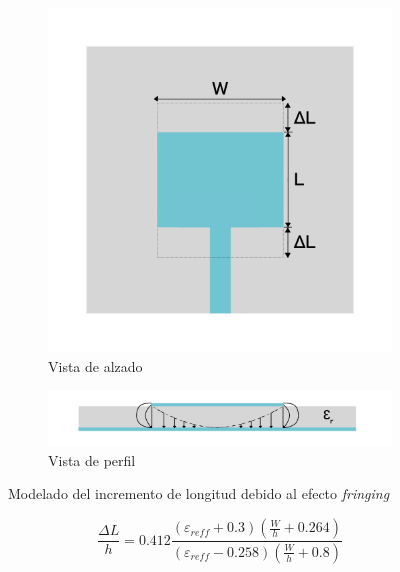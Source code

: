 \begin{figure}[h]
     \centering
     \begin{subfigure}[b]{0.7\textwidth}
         \centering
         \includegraphics[width=\textwidth]{archivos/parche/efectivelength2}
         \caption{Vista de alzado}
         \label{fig:planta}
     \end{subfigure}
     \hfill
     \begin{subfigure}[b]{0.7\textwidth}
         \centering
         \includegraphics[width=\textwidth]{archivos/parche/efectivelength}
         \caption{Vista de perfil}
         \label{fig:perfil}
     \end{subfigure}
     \hfill
        \caption{Modelado del incremento de longitud debido al efecto \textit{fringing}}
        \label{fig:modelado2}
\end{figure}

\begin{equation}
	\frac{\Delta L}{h}=0.412\frac{(\varepsilon _{reff}+0.3)(\frac{W}{h}+0.264)}{(\varepsilon _{reff}-0.258)(\frac{W}{h}+0.8)}
	\label{eq:deltal}
\end{equation}

